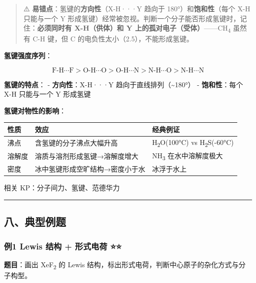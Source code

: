 \documentclass[a4paper,11pt]{ctexart}
\newcounter{none}
\begin{document}
\begin{quote}
⚠️ \textbf{易错点}：氢键的\textbf{方向性}（X-H···Y 趋向于 180°）和\textbf{饱和性}（每个 X-H 只能与一个 Y 形成氢键）经常被忽视。判断一个分子能否形成氢键时，记住：\textbf{必须同时有 X-H（供体）和 Y 上的孤对电子（受体）}------CH\textsubscript{4} 虽然有 C-H 键，但 C 的电负性太小（2.5），不能形成氢键。
\end{quote}

\textbf{氢键强度序列}：

\[
\text{F-H} \cdots \text{F} > \text{O-H} \cdots \text{O} > \text{O-H} \cdots \text{N} > \text{N-H} \cdots \text{O} > \text{N-H} \cdots \text{N}
\]

\textbf{氢键的特点}：
- \textbf{方向性}：X-H···Y 趋向于直线排列（\textasciitilde180°）
- \textbf{饱和性}：每个 X-H 只能与一个 Y 形成氢键

\textbf{氢键对物性的影响}：

{\def\LTcaptype{none} %
\begin{longtable}[]{@{}lll@{}}
\toprule\noalign{}
性质 & 效应 & 经典例证 \\
\midrule\noalign{}
\endhead
\bottomrule\noalign{}
\endlastfoot
沸点 & 含氢键的分子沸点大幅升高 & H\textsubscript{2}O(100°C) vs H\textsubscript{2}S(-60°C) \\
溶解度 & 溶质与溶剂形成氢键→溶解度增大 & NH\textsubscript{3} 在水中溶解度极大 \\
密度 & 冰中氢键形成空旷结构→密度小于水 & 冰浮于水上 \\
\end{longtable}
}

相关 KP：分子间力、氢键、范德华力

\begin{center}\rule{0.5\linewidth}{0.5pt}\end{center}

\subsection{八、典型例题}\label{ux516bux5178ux578bux4f8bux9898}

\subsubsection{例1 Lewis 结构 + 形式电荷 ⭐⭐}\label{ux4f8b1-lewis-ux7ed3ux6784-ux5f62ux5f0fux7535ux8377}

\textbf{题目}：画出 XeF\textsubscript{2} 的 Lewis 结构，标出形式电荷，判断中心原子的杂化方式与分子构型。
\end{document}
